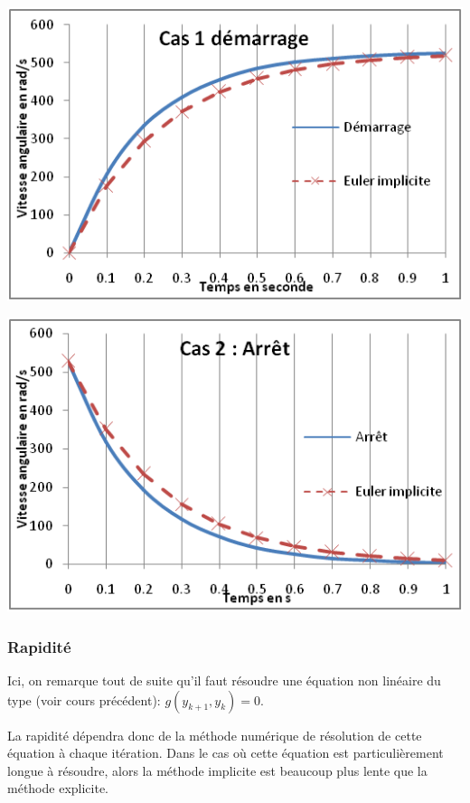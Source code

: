 \documentclass[10pt]{article}
\begin{document}
\begin{minipage}[c]{.47\linewidth}
\begin{center}
\includegraphics[width=.95\textwidth]{images/fig_09}
\end{center}
\end{minipage}
\hfill
\begin{minipage}[c]{.47\linewidth}
\begin{center}
\includegraphics[width=.95\textwidth]{images/fig_10}
\end{center}
\end{minipage}

\subsubsection{Rapidité}

Ici, on remarque tout de suite qu’il faut résoudre une équation non linéaire du type (voir cours précédent):
$g(y_{k+1},y_k)=0$.

La rapidité dépendra donc de la méthode numérique de résolution de cette équation à chaque itération. Dans le cas où cette équation est particulièrement longue à résoudre, alors la méthode implicite est beaucoup plus lente que la méthode explicite.
\end{document}
